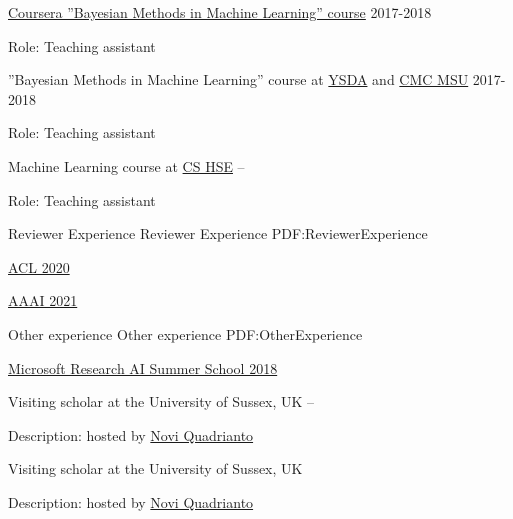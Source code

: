 \documentclass[letterpaper,MMMyyyy,nonstopmode]{simpleresumecv}
\begin{document}
\begin{Body}
\Gap

\BulletItem
\href{https://www.coursera.org/learn/bayesian-methods-in-machine-learning}
{Coursera ”Bayesian Methods in Machine Learning” course}
\hfill
2017-2018
\begin{Detail}
\Item
Role: Teaching assistant
\end{Detail}

\Gap

\BulletItem
”Bayesian Methods in Machine Learning” course at \href{https://yandexdataschool.com}{YSDA}
and \href{https://cs.msu.ru/en}{CMC MSU}
\hfill
2017-2018
\begin{Detail}
\Item
Role: Teaching assistant
\end{Detail}

\Gap

\BulletItem
Machine Learning course at \href{https://cs.hse.ru/en/}{CS HSE}
\hfill
{} --
\begin{Detail}
\Item
Role: Teaching assistant
\end{Detail}


\Section
{Reviewer Experience}
{Reviewer Experience}
{PDF:ReviewerExperience}

\BulletItem
\href{https://acl2020.org}{ACL 2020}

\BulletItem
\href{https://aaai.org/Conferences/AAAI-21/}{AAAI 2021}



\Section
{Other experience}
{Other experience}
{PDF:OtherExperience}

\Gap
\BulletItem
\href{https://www.microsoft.com/en-us/research/event/ai-summer-school-2018/}{Microsoft Research AI Summer School 2018}
\hfill
{}

\BulletItem Visiting scholar at the University of Sussex, UK
\hfill
{} --
\begin{Detail}
\Item
Description: hosted by \href{http://www.sussex.ac.uk/profiles/335583}{Novi Quadrianto}
\end{Detail}

\BulletItem Visiting scholar at the University of Sussex, UK
\hfill
{}
\begin{Detail}
\Item
Description: hosted by \href{http://www.sussex.ac.uk/profiles/335583}{Novi Quadrianto}
\end{Detail}



\end{Body}
\end{document}
